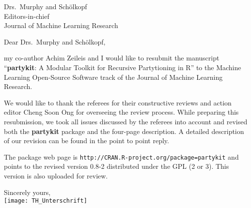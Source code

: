 \documentclass[ngerman,uzh]{scrlttr2}
\begin{document}

\begin{letter}{
Drs.~Murphy and Schölkopf \\
Editors-in-chief \\
Journal of Machine Learning Research}

\subject{JMLR-14-133 resubmission}

\opening{Dear Drs.~Murphy and Schölkopf,}

my co-author Achim Zeileis and I would like to resubmit the manuscript
``\textbf{partykit}: A Modular Toolkit for Recursive Partytioning in R'' to the
Machine Learning Open-Source Software track of the Journal of Machine
Learning Research.

We would like to thank the referees for their constructive reviews and
action editor Cheng Soon Ong for overseeing the review process. While
preparing this resubmission, we took all issues discussed by the referees
into account and revised both the \textbf{partykit} package and the four-page
description. A detailed description of our revision can be found in the
point to point reply.

The package web page is \texttt{http://CRAN.R-project.org/package=partykit}
and points to the revised version 0.8-2 distributed under the GPL (2 or 3).
This version is also uploaded for review. 

Sincerely yours, \\
\texttt{[image: TH\_Unterschrift]}

\end{letter}
\end{document}
